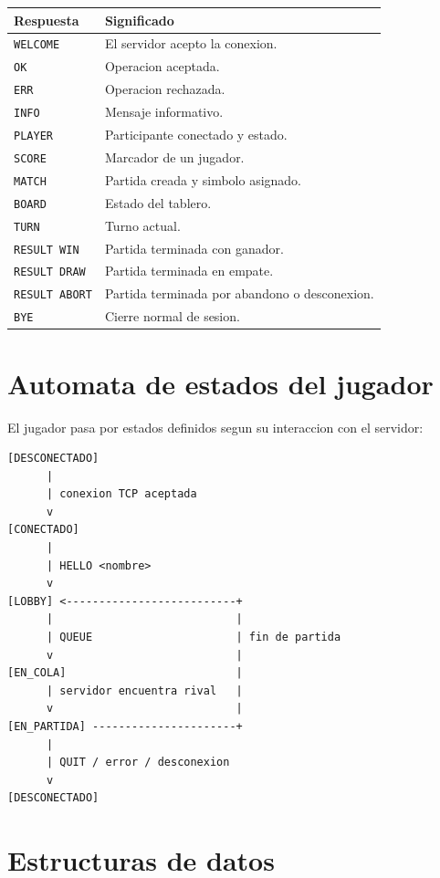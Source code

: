\documentclass[12pt,a4paper]{article}
\begin{document}
\begin{longtable}{|p{4cm}|p{10cm}|}
\hline
\textbf{Respuesta} & \textbf{Significado} \\
\hline
\texttt{WELCOME} & El servidor acepto la conexion. \\
\hline
\texttt{OK} & Operacion aceptada. \\
\hline
\texttt{ERR} & Operacion rechazada. \\
\hline
\texttt{INFO} & Mensaje informativo. \\
\hline
\texttt{PLAYER} & Participante conectado y estado. \\
\hline
\texttt{SCORE} & Marcador de un jugador. \\
\hline
\texttt{MATCH} & Partida creada y simbolo asignado. \\
\hline
\texttt{BOARD} & Estado del tablero. \\
\hline
\texttt{TURN} & Turno actual. \\
\hline
\texttt{RESULT WIN} & Partida terminada con ganador. \\
\hline
\texttt{RESULT DRAW} & Partida terminada en empate. \\
\hline
\texttt{RESULT ABORT} & Partida terminada por abandono o desconexion. \\
\hline
\texttt{BYE} & Cierre normal de sesion. \\
\hline
\end{longtable}

\section{Automata de estados del jugador}

El jugador pasa por estados definidos segun su interaccion con el servidor:

\begin{lstlisting}[style=code]
[DESCONECTADO]
      |
      | conexion TCP aceptada
      v
[CONECTADO]
      |
      | HELLO <nombre>
      v
[LOBBY] <--------------------------+
      |                            |
      | QUEUE                      | fin de partida
      v                            |
[EN_COLA]                          |
      | servidor encuentra rival   |
      v                            |
[EN_PARTIDA] ----------------------+
      |
      | QUIT / error / desconexion
      v
[DESCONECTADO]
\end{lstlisting}

\section{Estructuras de datos}
\end{document}
